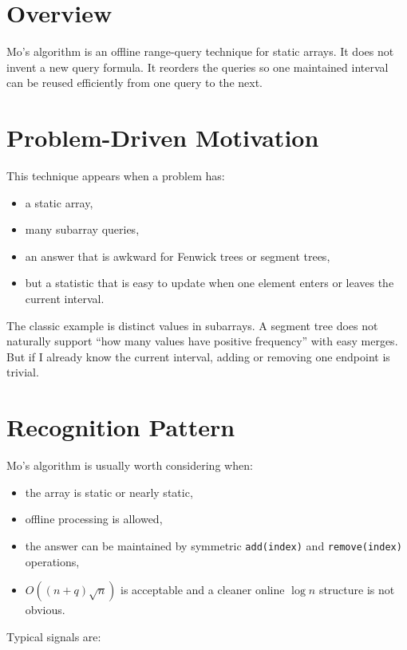 \section*{Overview}

Mo's algorithm is an offline range-query technique for static arrays. It does not invent a new query formula. It
reorders the queries so one maintained interval can be reused efficiently from one query to the next.

\section*{Problem-Driven Motivation}

This technique appears when a problem has:

\begin{itemize}
  \item a static array,
  \item many subarray queries,
  \item an answer that is awkward for Fenwick trees or segment trees,
  \item but a statistic that is easy to update when one element enters or leaves the current interval.
\end{itemize}

The classic example is distinct values in subarrays. A segment tree does not naturally support ``how many values have
positive frequency'' with easy merges. But if I already know the current interval, adding or removing one endpoint is
trivial.

\section*{Recognition Pattern}

Mo's algorithm is usually worth considering when:

\begin{itemize}
  \item the array is static or nearly static,
  \item offline processing is allowed,
  \item the answer can be maintained by symmetric \texttt{add(index)} and \texttt{remove(index)} operations,
  \item \(O((n+q)\sqrt{n})\) is acceptable and a cleaner online \(\log n\) structure is not obvious.
\end{itemize}

Typical signals are:


